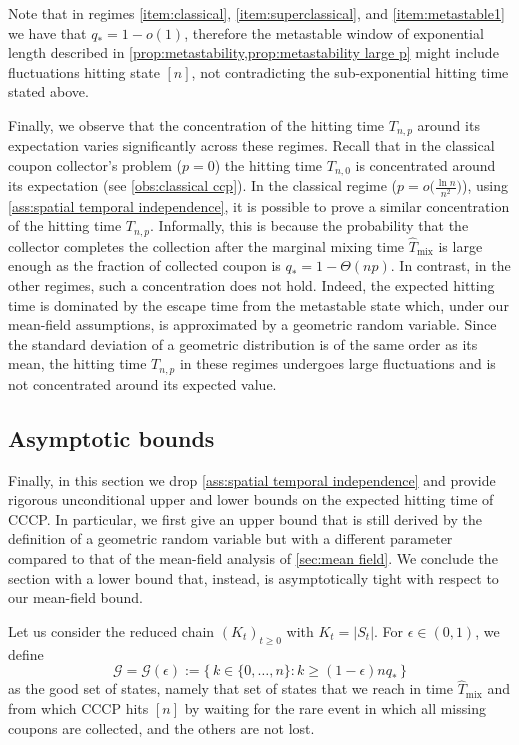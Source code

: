\documentclass[11pt,a4paper]{article}
\newcommand{\Tmar}{\hat{T}_{\mathrm{mix}}}
\begin{document}
Note that in regimes \ref{item:classical}, \ref{item:superclassical}, and \ref{item:metastable1} we have that $q_* = 1-o(1)$, therefore the metastable window of exponential length described in \cref{prop:metastability,prop:metastability large p} might include fluctuations hitting state $[n]$, not contradicting the sub-exponential hitting time stated above.


Finally, we observe that the concentration of the hitting time $T_{n,p}$ around its expectation varies significantly across these regimes. 
Recall that in the classical coupon collector's problem ($p=0$) the hitting time $T_{n,0}$ is concentrated around its expectation (see \cref{obs:classical ccp}). 
In the classical regime ($p=o\big(\frac{\ln n}{n^2}\big)$), using \cref{ass:spatial temporal independence}, it is possible to prove a similar concentration of the hitting time $T_{n,p}$.
Informally, this is because the probability that the collector completes the collection after the marginal mixing time $\Tmar$ is large enough as the fraction of collected coupon is $q_* = 1-\Theta(np)$.
In contrast, in the other regimes, such a concentration does not hold. Indeed, the expected hitting time is dominated by the escape time from the metastable state which, under our mean-field assumptions, is approximated by a geometric random variable. Since the standard deviation of a geometric distribution is of the same order as its mean, the hitting time $T_{n,p}$ in these regimes undergoes large fluctuations and is not concentrated around its expected value.




\subsection{Asymptotic bounds}\label{sec:bounds}
Finally, in this section we drop \cref{ass:spatial temporal independence} and provide rigorous unconditional upper and lower bounds on the expected hitting time of CCCP.
In particular, we first give an upper bound that is still derived by the definition of a geometric random variable but with a different parameter compared to that of the mean-field analysis of \cref{sec:mean field}.
We conclude the section with a lower bound that, instead, is asymptotically tight with respect to our mean-field bound.


Let us consider the reduced chain $(K_t)_{t\ge 0}$ with $K_t = |S_t|$.
For $\epsilon\in(0,1)$, we define
\begin{equation}\label{eq:good states}
    \mathcal{G} = \mathcal{G}(\epsilon) := \{\, k \in \{0,\dots,n\} : k \ge (1-\epsilon) n q_* \,\}
\end{equation}
as the good set of states, namely that set of states that we reach in time $\Tmar$ and from which CCCP hits $[n]$ by waiting for the rare event in which all missing coupons are collected, and the others are not lost. 
\end{document}
